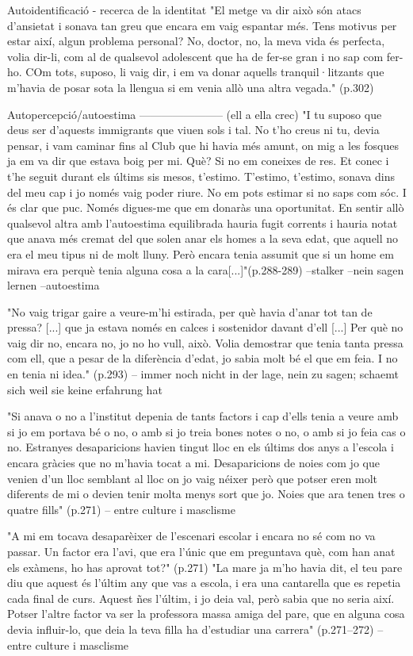 Autoidentificació - recerca de la identitat
"El metge va dir això són atacs d'ansietat i sonava tan greu que encara em vaig espantar més. Tens motivus per estar així, algun problema personal? No, doctor, no, la meva vida és perfecta, volia dir-li, com al de qualsevol adolescent que ha de fer-se gran i no sap com fer-ho. COm tots, suposo, li vaig dir, i em va donar aquells tranquil·litzants que m'havia de posar sota la llengua si em venia allò una altra vegada." (p.302)

Autopercepció/autoestima
-----------------------
(ell a ella crec)
"I tu suposo que deus ser d'aquests immigrants que viuen sols i tal. No t'ho creus ni tu, devia pensar, i vam caminar fins al Club que hi havia més amunt, on mig a les fosques ja em va dir que estava boig per mi. Què? Si no em coneixes de res. Et conec i t'he seguit durant els últims sis mesos, t'estimo. T'estimo, t'estimo, sonava dins del meu cap i jo només vaig poder riure. No em pots estimar si no saps com sóc. I és clar que puc. Només digues-me que em donaràs una oportunitat. En sentir allò qualsevol altra amb l'autoestima equilibrada hauria fugit corrents i hauria notat que anava més cremat del que solen anar els homes a la seva edat, que aquell no era el meu tipus ni de molt lluny. Però encara tenia assumit que si un home em mirava era perquè tenia alguna cosa a la cara[...]"(p.288-289)
--stalker
--nein sagen lernen
--autoestima

"No vaig trigar gaire a veure-m'hi estirada, per què havia d'anar tot tan de pressa? [...] que ja estava només en calces i sostenidor davant d'ell [...] Per què no vaig dir no, encara no, jo no ho vull, això. Volia demostrar que tenia tanta pressa com ell, que a pesar de la diferència d'edat, jo sabia molt bé el que em feia. I no en tenia ni idea." (p.293)
-- immer noch nicht in der lage, nein zu sagen; schaemt sich weil sie keine erfahrung hat


"Si anava o no a l'institut depenia de tants factors i cap d'ells tenia a veure amb si jo em portava bé o no, o amb si jo treia bones notes o no, o amb si jo feia cas o no. Estranyes desaparicions havien tingut lloc en els últims dos anys a l'escola i encara gràcies que no m'havia tocat a mi. Desaparicions de noies com jo que venien d'un lloc semblant al lloc on jo vaig néixer però que potser eren molt diferents de mi o devien tenir molta menys sort que jo. Noies que ara tenen tres o quatre fills" (p.271)
-- entre culture i masclisme

"A mi em tocava desaparèixer de l'escenari escolar i encara no sé com no va passar. Un factor era l'avi, que era l'únic que em preguntava què, com han anat els exàmens, ho has aprovat tot?" (p.271)
"La mare ja m'ho havia dit, el teu pare diu que aquest és l'últim any que vas a escola, i era una cantarella que es repetia cada final de curs. Aquest ñes l'últim, i jo deia val, però sabia que no seria així. Potser l'altre factor va ser la professora massa amiga del pare, que en alguna cosa devia influir-lo, que deia la teva filla ha d'estudiar una carrera" (p.271--272)
-- entre culture i masclisme


